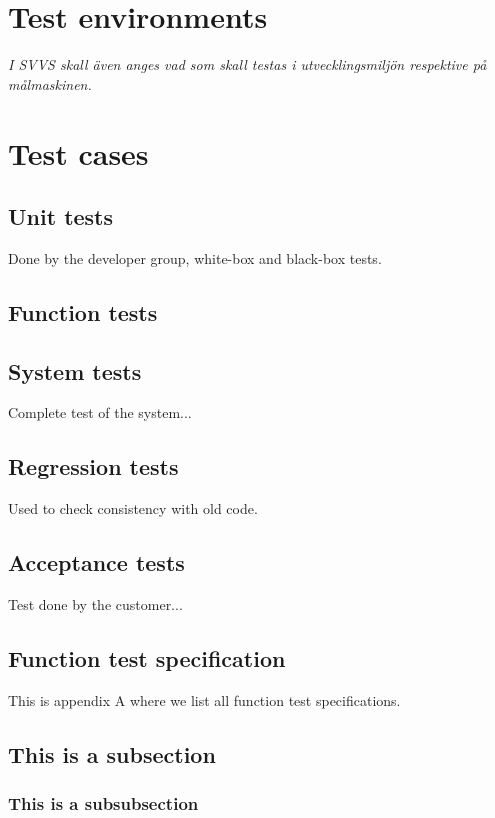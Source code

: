 \documentclass[a4paper]{article}
\begin{document}
\section{Test environments}
\textit{I SVVS skall även anges vad som skall testas i utvecklingsmiljön respektive på målmaskinen.}

\section{Test cases}

\subsection{Unit tests}
Done by the developer group, white-box and black-box tests.

\subsection{Function tests}

\subsection{System tests}
Complete test of the system...

\subsection{Regression tests}
Used to check consistency with old code.  

\subsection{Acceptance tests}
Test done by the customer...

\newpage
\begin{appendices}

\section{Function test specification}
This is appendix A where we list all function test specifications.

\subsection{This is a subsection}

\subsubsection{This is a subsubsection}

\end{appendices}
\end{document}
